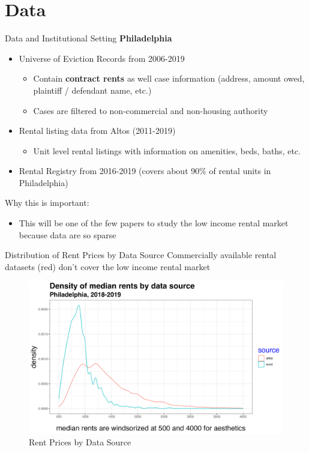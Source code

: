 \documentclass[10pt, xcolor=dvipsnames]{beamer}
\begin{document}
    


\section{Data}

\begin{frame}{Data and Institutional Setting}
\textbf{Philadelphia}
    \begin{itemize}
        \item Universe of Eviction Records from 2006-2019
        \begin{itemize}
            \item Contain \textbf{contract rents} as well case information (address, amount owed, plaintiff / defendant name, etc.)
            \item Cases are filtered to non-commercial and non-housing authority
        \end{itemize}
        \item Rental listing data from Altos (2011-2019)
        \begin{itemize}
            \item Unit level rental listings with information on amenities, beds, baths, etc. 
        \end{itemize}
        \item Rental Registry from 2016-2019 (covers about 90\% of rental units in Philadelphia)
    \end{itemize}
    \pause
    Why this is important:\\
    \begin{itemize}
        \item This will be one of the few papers to study the low income rental market because data are so sparse 
    \end{itemize}
\end{frame}

\begin{frame}{Distribution of Rent Prices by Data Source}
Commercially available rental datasets (\textcolor{altos}{red}) don't cover the low income rental market\\
    \begin{figure}
        \centering
        \includegraphics[width=0.75\linewidth]{figs/density_rent_prices.png}
        \caption{Rent Prices by Data Source}
        \label{fig:rent-dist}
    \end{figure}
\end{frame}
\end{document}
